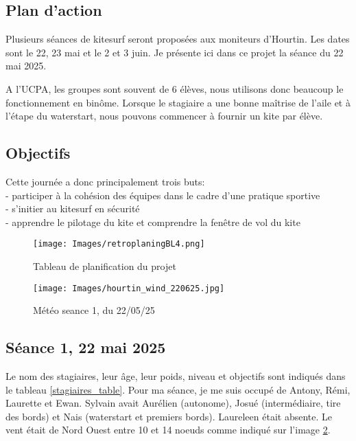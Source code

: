 \documentclass[11pt,a4paper]{report}
\begin{document}
\subsection{Plan d'action}
Plusieurs séances de kitesurf seront proposées aux moniteurs d'Hourtin.
Les dates sont le 22, 23 mai et le 2 et 3 juin.
Je présente ici dans ce projet la séance du 22 mai 2025.

A l'UCPA, les groupes sont souvent de 6 élèves, nous
utilisons donc beaucoup le fonctionnement en bin\^ome. 
Lorsque le stagiaire a une bonne maîtrise de l'aile et
à l'étape du waterstart, nous pouvons commencer à fournir
un kite par élève.
\subsection{Objectifs}
Cette journée a donc principalement trois buts:\\
- participer à la cohésion des équipes dans le cadre d'une pratique sportive \\
- s'initier au kitesurf en sécurité \\
- apprendre le pilotage du kite et comprendre la fen\^etre de vol du kite
\begin{figure}
\centering
\texttt{[image: Images/retroplaningBL4.png]} 
\caption{Tableau de planification du projet \label{gantt}}
\end{figure}
\begin{figure}
\centering
\texttt{[image: Images/hourtin\_wind\_220625.jpg]} 
\caption{Météo seance 1, du 22/05/25\label{meteo}}
\end{figure}
\subsection{Séance 1, 22 mai 2025}

Le nom des stagiaires, leur \^age, leur poids, niveau et objectifs sont
indiqués dans le tableau \ref{stagiaires_table}.
Pour ma séance, je me suis occupé de Antony, Rémi, Laurette et Ewan.
Sylvain avait Aurélien (autonome), Josué (intermédiaire, tire des bords)
et Nais (waterstart et premiers bords).
Laureleen était absente.
Le vent était de Nord Ouest entre 10 et 14 noeuds comme indiqué sur
l'image \ref{meteo}.
\end{document}
